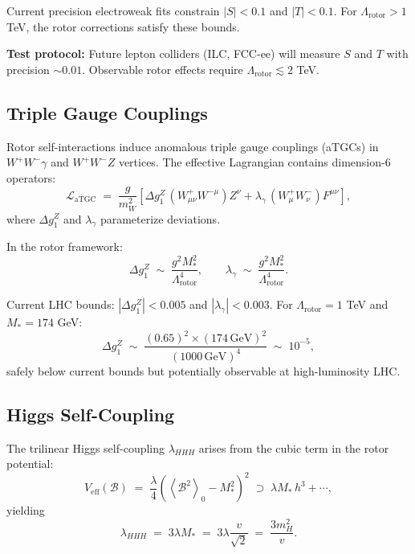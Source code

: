 \documentclass[11pt,a4paper]{article}
\newcommand{\grade}[2]{\left\langle #1 \right\rangle_{#2}}
\newcommand{\scal}[1]{\grade{#1}{0}}
\newcommand{\Biv}{\mathcal{B}}
\newcommand{\Lag}{\mathcal{L}}
\theoremstyle{definition}
\theoremstyle{plain}
\theoremstyle{remark}
\begin{document}
Current precision electroweak fits constrain $|S| < 0.1$ and $|T| < 0.1$. For $\Lambda_{\text{rotor}} > 1$ TeV, the rotor corrections satisfy these bounds.

\textbf{Test protocol:} Future lepton colliders (ILC, FCC-ee) will measure $S$ and $T$ with precision $\sim 0.01$. Observable rotor effects require $\Lambda_{\text{rotor}} \lesssim 2$ TeV.

\subsection{Triple Gauge Couplings}

Rotor self-interactions induce anomalous triple gauge couplings (aTGCs) in $W^+W^-\gamma$ and $W^+W^-Z$ vertices. The effective Lagrangian contains dimension-6 operators:
\begin{equation}
  \Lag_{\text{aTGC}} \;=\; \frac{g}{m_W^2}\left[\Delta g_1^Z\,(W_{\mu\nu}^+W^{-\mu})Z^\nu + \lambda_\gamma\,(W_{\mu}^+W_{\nu}^-)F^{\mu\nu}\right],
\end{equation}
where $\Delta g_1^Z$ and $\lambda_\gamma$ parameterize deviations.

In the rotor framework:
\begin{equation}
  \Delta g_1^Z \;\sim\; \frac{g^2 M_\ast^2}{\Lambda_{\text{rotor}}^4},
  \qquad
  \lambda_\gamma \;\sim\; \frac{g^2 M_\ast^2}{\Lambda_{\text{rotor}}^4}.
\end{equation}

Current LHC bounds: $|\Delta g_1^Z| < 0.005$ and $|\lambda_\gamma| < 0.003$. For $\Lambda_{\text{rotor}} = 1$ TeV and $M_\ast = 174$ GeV:
\begin{equation}
  \Delta g_1^Z \;\sim\; \frac{(0.65)^2 \times (174\,\text{GeV})^2}{(1000\,\text{GeV})^4}
  \;\sim\; 10^{-5},
\end{equation}
safely below current bounds but potentially observable at high-luminosity LHC.

\subsection{Higgs Self-Coupling}

The trilinear Higgs self-coupling $\lambda_{HHH}$ arises from the cubic term in the rotor potential:
\begin{equation}
  V_{\text{eff}}(\Biv) \;=\; \frac{\lambda}{4}(\scal{\Biv^2} - M_\ast^2)^2
  \;\supset\; \lambda M_\ast\,h^3 + \cdots,
\end{equation}
yielding
\begin{equation}
  \lambda_{HHH} \;=\; 3\lambda M_\ast \;=\; 3\lambda\frac{v}{\sqrt{2}}
  \;=\; \frac{3m_H^2}{v}.
\end{equation}
\end{document}
